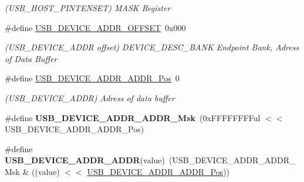\begin{DoxyCompactItemize}
\begin{DoxyCompactList}\small\item\em (U\+S\+B\+\_\+\+H\+O\+S\+T\+\_\+\+P\+I\+N\+T\+E\+N\+S\+E\+T) M\+A\+S\+K Register \end{DoxyCompactList}\item 
\hypertarget{group___s_a_m_l21___u_s_b_ga39bb1fdc4210d8fef2114560119b9655}{}\#define \hyperlink{group___s_a_m_l21___u_s_b_ga39bb1fdc4210d8fef2114560119b9655}{U\+S\+B\+\_\+\+D\+E\+V\+I\+C\+E\+\_\+\+A\+D\+D\+R\+\_\+\+O\+F\+F\+S\+E\+T}~0x000\label{group___s_a_m_l21___u_s_b_ga39bb1fdc4210d8fef2114560119b9655}

\begin{DoxyCompactList}\small\item\em (U\+S\+B\+\_\+\+D\+E\+V\+I\+C\+E\+\_\+\+A\+D\+D\+R offset) D\+E\+V\+I\+C\+E\+\_\+\+D\+E\+S\+C\+\_\+\+B\+A\+N\+K Endpoint Bank, Adress of Data Buffer \end{DoxyCompactList}\item 
\hypertarget{group___s_a_m_l21___u_s_b_gaf11069ea7afed69a6206aed4d5127dab}{}\#define \hyperlink{group___s_a_m_l21___u_s_b_gaf11069ea7afed69a6206aed4d5127dab}{U\+S\+B\+\_\+\+D\+E\+V\+I\+C\+E\+\_\+\+A\+D\+D\+R\+\_\+\+A\+D\+D\+R\+\_\+\+Pos}~0\label{group___s_a_m_l21___u_s_b_gaf11069ea7afed69a6206aed4d5127dab}

\begin{DoxyCompactList}\small\item\em (U\+S\+B\+\_\+\+D\+E\+V\+I\+C\+E\+\_\+\+A\+D\+D\+R) Adress of data buffer \end{DoxyCompactList}\item 
\hypertarget{group___s_a_m_l21___u_s_b_ga730864a840b90ba51155d5722cf230a0}{}\#define {\bfseries U\+S\+B\+\_\+\+D\+E\+V\+I\+C\+E\+\_\+\+A\+D\+D\+R\+\_\+\+A\+D\+D\+R\+\_\+\+Msk}~(0x\+F\+F\+F\+F\+F\+F\+F\+Ful $<$$<$ U\+S\+B\+\_\+\+D\+E\+V\+I\+C\+E\+\_\+\+A\+D\+D\+R\+\_\+\+A\+D\+D\+R\+\_\+\+Pos)\label{group___s_a_m_l21___u_s_b_ga730864a840b90ba51155d5722cf230a0}

\item 
\hypertarget{group___s_a_m_l21___u_s_b_ga841836a16765cae5ee0d92a955fbf777}{}\#define {\bfseries U\+S\+B\+\_\+\+D\+E\+V\+I\+C\+E\+\_\+\+A\+D\+D\+R\+\_\+\+A\+D\+D\+R}(value)~(U\+S\+B\+\_\+\+D\+E\+V\+I\+C\+E\+\_\+\+A\+D\+D\+R\+\_\+\+A\+D\+D\+R\+\_\+\+Msk \& ((value) $<$$<$ \hyperlink{group___s_a_m_l21___u_s_b_gaf11069ea7afed69a6206aed4d5127dab}{U\+S\+B\+\_\+\+D\+E\+V\+I\+C\+E\+\_\+\+A\+D\+D\+R\+\_\+\+A\+D\+D\+R\+\_\+\+Pos}))\label{group___s_a_m_l21___u_s_b_ga841836a16765cae5ee0d92a955fbf777}


\end{DoxyCompactItemize}
